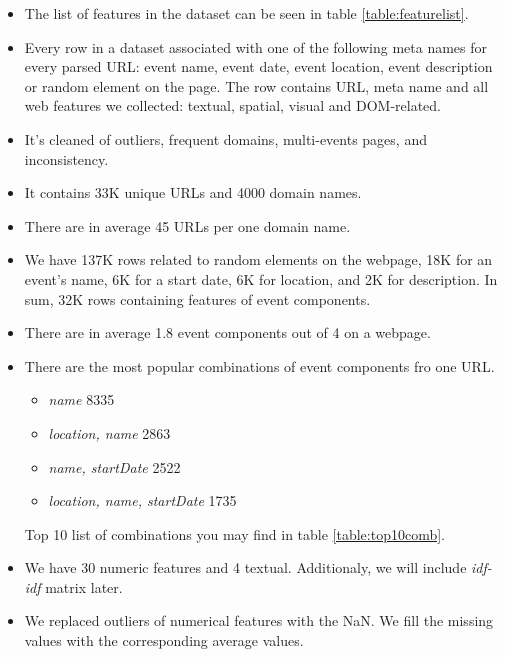 \begin{itemize}
    \item The list of features in the dataset can be seen in table \ref{table:featurelist}.
    \item Every row in a dataset associated with one of the following meta names for every parsed URL: event name, event date, event location, event description or random element on the page. The row contains URL, meta name and all web features we collected: textual, spatial, visual and DOM-related.
    \item It's cleaned of outliers, frequent domains, multi-events pages, and inconsistency. 
    \item It contains 33K unique URLs and  4000 domain names. 
    \item There are in average 45 URLs per one domain name. 
    \item We have 137K rows related to random elements on the webpage, 18K for an event's name, 6K for a start date, 6K for location, and 2K for description. In sum, 32K rows containing features of event components. 
    \item There are in average 1.8 event components out of 4 on a webpage. 
    \item There are the most popular combinations of event components fro one URL. 
    \begin{itemize}
        \item \textit{name} 8335
        \item \textit{location, name} 2863 
        \item \textit{name, startDate} 2522 
        \item \textit{location, name, startDate} 1735
    \end{itemize}
    Top 10 list of combinations you may find in table \ref{table:top10comb}.
    \item We have 30 numeric features and 4 textual. Additionaly, we will include \textit{idf-idf} matrix later.
    \item We replaced outliers of numerical features with the NaN. We fill the missing values with the corresponding average values.
\end{itemize}


